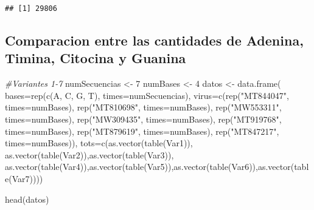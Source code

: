 \documentclass[
]{article}
\newenvironment{Shaded}{\begin{snugshade}}{\end{snugshade}}
\newcommand{\AttributeTok}[1]{\textcolor[rgb]{0.77,0.63,0.00}{#1}}
\newcommand{\CommentTok}[1]{\textcolor[rgb]{0.56,0.35,0.01}{\textit{#1}}}
\newcommand{\DecValTok}[1]{\textcolor[rgb]{0.00,0.00,0.81}{#1}}
\newcommand{\FunctionTok}[1]{\textcolor[rgb]{0.00,0.00,0.00}{#1}}
\newcommand{\NormalTok}[1]{#1}
\newcommand{\OtherTok}[1]{\textcolor[rgb]{0.56,0.35,0.01}{#1}}
\newcommand{\StringTok}[1]{\textcolor[rgb]{0.31,0.60,0.02}{#1}}
\begin{document}
\begin{verbatim}
## [1] 29806
\end{verbatim}

\hypertarget{comparacion-entre-las-cantidades-de-adenina-timina-citocina-y-guanina}{%
\subsection{Comparacion entre las cantidades de Adenina, Timina,
Citocina y
Guanina}\label{comparacion-entre-las-cantidades-de-adenina-timina-citocina-y-guanina}}

\begin{Shaded}
\begin{Highlighting}[]
\CommentTok{\#Variantes 1{-}7}
\NormalTok{numSecuencias }\OtherTok{\textless{}{-}} \DecValTok{7}
\NormalTok{numBases }\OtherTok{\textless{}{-}} \DecValTok{4}
\NormalTok{datos }\OtherTok{\textless{}{-}} \FunctionTok{data.frame}\NormalTok{( }\AttributeTok{bases=}\FunctionTok{rep}\NormalTok{(}\FunctionTok{c}\NormalTok{(}\StringTok{\textquotesingle{}A\textquotesingle{}}\NormalTok{, }\StringTok{\textquotesingle{}C\textquotesingle{}}\NormalTok{, }\StringTok{\textquotesingle{}G\textquotesingle{}}\NormalTok{, }\StringTok{\textquotesingle{}T\textquotesingle{}}\NormalTok{), }\AttributeTok{times=}\NormalTok{numSecuencias),}
                     \AttributeTok{virus=}\FunctionTok{c}\NormalTok{(}\FunctionTok{rep}\NormalTok{(}\StringTok{"MT844047"}\NormalTok{, }\AttributeTok{times=}\NormalTok{numBases),}
                     \FunctionTok{rep}\NormalTok{(}\StringTok{"MT810698"}\NormalTok{, }\AttributeTok{times=}\NormalTok{numBases),}
                     \FunctionTok{rep}\NormalTok{(}\StringTok{"MW553311"}\NormalTok{, }\AttributeTok{times=}\NormalTok{numBases),}
                     \FunctionTok{rep}\NormalTok{(}\StringTok{"MW309435"}\NormalTok{, }\AttributeTok{times=}\NormalTok{numBases),}
                     \FunctionTok{rep}\NormalTok{(}\StringTok{"MT919768"}\NormalTok{, }\AttributeTok{times=}\NormalTok{numBases),}
                     \FunctionTok{rep}\NormalTok{(}\StringTok{"MT879619"}\NormalTok{, }\AttributeTok{times=}\NormalTok{numBases),}
                     \FunctionTok{rep}\NormalTok{(}\StringTok{"MT847217"}\NormalTok{, }\AttributeTok{times=}\NormalTok{numBases)),}
                     \AttributeTok{tots=}\FunctionTok{c}\NormalTok{(}\FunctionTok{as.vector}\NormalTok{(}\FunctionTok{table}\NormalTok{(Var1)), }\FunctionTok{as.vector}\NormalTok{(}\FunctionTok{table}\NormalTok{(Var2)),}\FunctionTok{as.vector}\NormalTok{(}\FunctionTok{table}\NormalTok{(Var3)),}
                     \FunctionTok{as.vector}\NormalTok{(}\FunctionTok{table}\NormalTok{(Var4)),}\FunctionTok{as.vector}\NormalTok{(}\FunctionTok{table}\NormalTok{(Var5)),}\FunctionTok{as.vector}\NormalTok{(}\FunctionTok{table}\NormalTok{(Var6)),}\FunctionTok{as.vector}\NormalTok{(}\FunctionTok{table}\NormalTok{(Var7))))}

\FunctionTok{head}\NormalTok{(datos)}
\end{Highlighting}
\end{Shaded}
\end{document}
